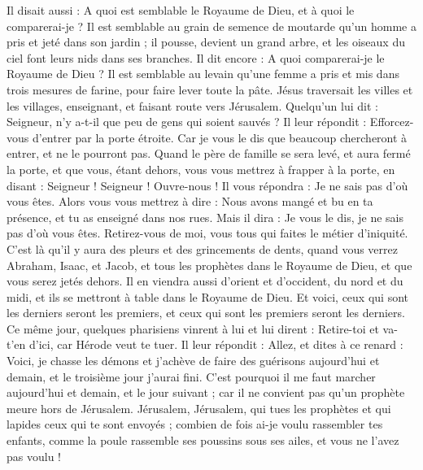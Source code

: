 \begin{multicols}{2}
Il disait aussi : A quoi est semblable le Royaume de Dieu, et à quoi le comparerai-je ?
Il est semblable au grain de semence de moutarde qu'un homme a pris et jeté dans son jardin ; il pousse, devient un grand arbre, et les oiseaux du ciel font leurs nids dans ses branches.
Il dit encore : A quoi comparerai-je le Royaume de Dieu ?
Il est semblable au levain qu'une femme a pris et mis dans trois mesures de farine, pour faire lever toute la pâte.
Jésus traversait les villes et les villages, enseignant, et faisant route vers Jérusalem.
Quelqu'un lui dit : Seigneur, n'y a-t-il que peu de gens qui soient sauvés ? Il leur répondit :
Efforcez-vous d'entrer par la porte étroite. Car je vous le dis que beaucoup chercheront à entrer, et ne le pourront pas.
Quand le père de famille se sera levé, et aura fermé la porte, et que vous, étant dehors, vous vous mettrez à frapper à la porte, en disant : Seigneur ! Seigneur ! Ouvre-nous ! Il vous répondra : Je ne sais pas d'où vous êtes.
Alors vous vous mettrez à dire : Nous avons mangé et bu en ta présence, et tu as enseigné dans nos rues.
Mais il dira : Je vous le dis, je ne sais pas d'où vous êtes. Retirez-vous de moi, vous tous qui faites le métier d'iniquité.
C'est là qu'il y aura des pleurs et des grincements de dents, quand vous verrez Abraham, Isaac, et Jacob, et tous les prophètes dans le Royaume de Dieu, et que vous serez jetés dehors.
Il en viendra aussi d'orient et d'occident, du nord et du midi, et ils se mettront à table dans le Royaume de Dieu.
Et voici, ceux qui sont les derniers seront les premiers, et ceux qui sont les premiers seront les derniers.
Ce même jour, quelques pharisiens vinrent à lui et lui dirent : Retire-toi et va-t'en d'ici, car Hérode veut te tuer.
Il leur répondit : Allez, et dites à ce renard : Voici, je chasse les démons et j'achève de faire des guérisons aujourd'hui et demain, et le troisième jour j'aurai fini.
C'est pourquoi il me faut marcher aujourd'hui et demain, et le jour suivant ; car il ne convient pas qu'un prophète meure hors de Jérusalem.
Jérusalem, Jérusalem, qui tues les prophètes et qui lapides ceux qui te sont envoyés ; combien de fois ai-je voulu rassembler tes enfants, comme la poule rassemble ses poussins sous ses ailes, et vous ne l'avez pas voulu !

\end{multicols}
